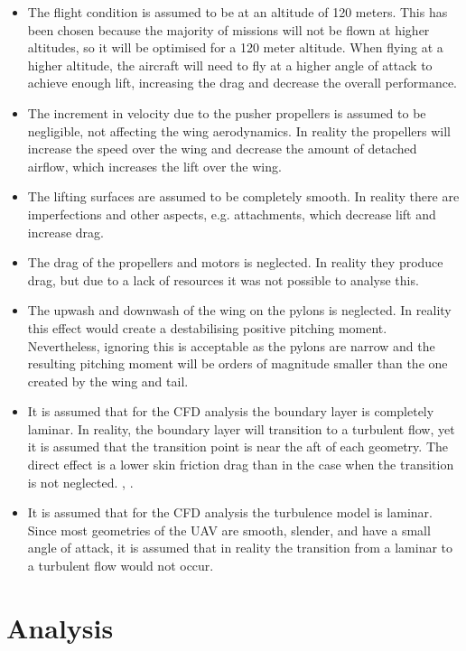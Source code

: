 \begin{itemize}
    \item The flight condition is assumed to be at an altitude of 120 meters. This has been chosen because the majority of missions will not be flown at higher altitudes, so it will be optimised for a 120 meter altitude. When flying at a higher altitude, the aircraft will need to fly at a higher angle of attack to achieve enough lift, increasing the drag and decrease the overall performance.
    \item The increment in velocity due to the pusher propellers is assumed to be negligible, not affecting the wing aerodynamics. In reality the propellers will increase the speed over the wing and decrease the amount of detached airflow, which increases the lift over the wing.
    \item The lifting surfaces are assumed to be completely smooth. In reality there are imperfections and other aspects, e.g. attachments, which decrease lift and increase drag.
    \item The drag of the propellers and motors is neglected. In reality they produce drag, but due to a lack of resources it was not possible to analyse this.
    \item The upwash and downwash of the wing on the pylons is neglected. In reality this effect would create a destabilising positive pitching moment. Nevertheless, ignoring this is acceptable as the pylons are narrow and the resulting pitching moment will be orders of magnitude smaller than the one created by the wing and tail.
    \item It is assumed that for the CFD analysis the boundary layer is completely laminar. In reality, the boundary layer will transition to a turbulent flow, yet it is assumed that the transition point is near the aft of each geometry. The direct effect is a lower skin friction drag than in the case when the transition is not neglected. \cite[75]{anderson}, \cite[170]{fluidmech}.
    \item It is assumed that for the CFD analysis the turbulence model is laminar. Since most geometries of the UAV are smooth, slender, and have a small angle of attack, it is assumed that in reality the transition from a laminar to a turbulent flow would not occur.
\end{itemize}

\section{Analysis}

